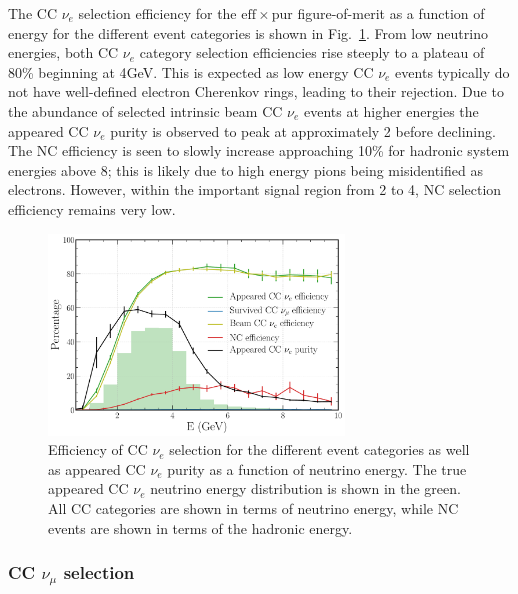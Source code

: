The CC $\nu_{e}$ selection efficiency for the $\mathrm{eff}\times\mathrm{pur}$ figure-of-merit as
a function of energy for the different event categories is shown in
Fig.~\ref{fig:final_nuel_hists}. From low neutrino energies, both CC $\nu_{e}$ category selection
efficiencies rise steeply to a plateau of 80\% beginning at \unit{4}{GeV}. This is expected as low
energy CC $\nu_{e}$ events typically do not have well-defined electron Cherenkov rings, leading to
their rejection. Due to the abundance of selected intrinsic beam CC $\nu_{e}$ events at higher
energies the appeared CC $\nu_{e}$ purity is observed to peak at approximately \unit{2}{\GeV}
before declining. The NC efficiency is seen to slowly increase approaching 10\% for hadronic
system energies above \unit{8}{\GeV}; this is likely due to high energy pions being misidentified
as electrons. However, within the important signal region from 2 to \unit{4}{\GeV}, NC selection
efficiency remains very low.

\begin{figure} %
    \includegraphics[width=0.7\textwidth]{diagrams/6-cvn/chipsnet/final_nuel_hists.pdf}
    \caption[Efficiency of CC $\nu_{e}$ selection as a function of energy.]
    {Efficiency of CC $\nu_{e}$ selection for the different event categories as well as appeared
        CC $\nu_{e}$ purity as a function of neutrino energy. The true appeared CC $\nu_{e}$
        neutrino energy distribution is shown in the green. All CC categories are shown in terms
        of neutrino energy, while NC events are shown in terms of the hadronic energy.}
    \label{fig:final_nuel_hists}
\end{figure}

\subsubsection*{CC $\nu_{\mu}$ selection} %

